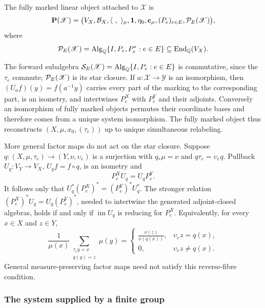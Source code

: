 \begin{definition}
\label{def:fully-marked-object}
The fully marked linear object attached to \(\mathscr X\) is
\[
 \mathbf P(\mathscr X)=
 \bigl(
 V_X,\mathcal B_X,\langle\ ,\ \rangle_\mu,\mathbf1,\eta_0,
 \mathbf c_\mu,(P_e)_{e\in E},
 \mathcal P_E(\mathscr X)
 \bigr),
\]
where
\[
 \mathcal P_E(\mathscr X)
 =\operatorname{Alg}_\mathbb Q\{I,P_e,P_e^*:e\in E\}\subseteq\operatorname{End}_\mathbb Q(V_X).
\]
\end{definition}

The forward subalgebra
\(\mathcal S_E(\mathscr X)=\operatorname{Alg}_\mathbb Q\{I,P_e:e\in E\}\) is commutative, since the
\(\tau_e\) commute; \(\mathcal P_E(\mathscr X)\) is its star closure.
If \(a:\mathscr X\to\mathscr Y\) is an isomorphism, then
\((U_af)(y)=f(a^{-1}y)\) carries every part of the marking to the
corresponding part, is an isometry, and intertwines \(P_e^X\) with
\(P_e^Y\) and their adjoints.  Conversely an isomorphism of fully marked
objects permutes their coordinate bases and therefore comes from a unique
system isomorphism.  The fully marked object thus reconstructs
\((X,\mu,x_0,(\tau_e))\) up to unique simultaneous relabeling.

More general factor maps do not act on the star closure.  Suppose
\(q:(X,\mu,\tau_e)\to(Y,\nu,\upsilon_e)\) is a surjection with
\(q_*\mu=\nu\) and \(q\tau_e=\upsilon_eq\).  Pullback
\(U_q:V_Y\to V_X\), \(U_qf=f\circ q\), is an isometry and
\begin{equation}
 P_e^XU_q=U_qP_e^Y.
 \label{eq:factor-forward-intertwining}
\end{equation}
It follows only that
\(U_q^*(P_e^X)^*=(P_e^Y)^*U_q^*\).  The stronger relation
\((P_e^X)^*U_q=U_q(P_e^Y)^*\), needed to intertwine the generated
adjoint-closed algebras, holds if and only if
\(\operatorname{im}U_q\) is reducing for \(P_e^X\).  Equivalently, for
every \(x\in X\) and \(z\in Y\),
\begin{equation}
 \frac1{\mu(x)}
 \sum_{\substack{\tau_e y=x\\q(y)=z}}\mu(y)
 =
 \begin{cases}
 \displaystyle\frac{\nu(z)}{\nu(q(x))},
   &\upsilon_ez=q(x),\\[6pt]
 0,&\upsilon_ez\ne q(x).
 \end{cases}
 \label{eq:reverse-fibre-condition}
\end{equation}
General measure-preserving factor maps need not satisfy this
reverse-fibre condition.

\subsubsection{The system supplied by a finite group}


